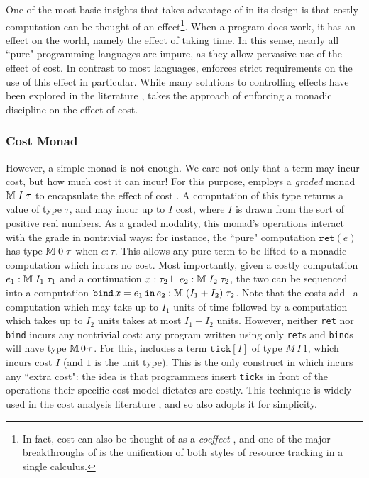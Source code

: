 One of the most basic insights that \lambdaamor takes advantage of in its design is that costly computation can be thought of an effect\footnote{
In fact, cost can also be thought of as a \textit{coeffect} \cite{girard-et-al:tcs92:bll}, and one of the major breakthroughs of \lambdaamor is the unification
of both styles of resource tracking in a single calculus.
}. When a program does work, it has an effect on the world, namely the effect of taking time. In this sense, nearly all ``pure" programming languages are impure, as they allow pervasive use of the effect of cost. In contrast to most languages, \lambdaamor enforces strict requirements on the use of this effect in particular. While many solutions to controlling effects have been explored in the literature \citehere, \lambdaamor takes the approach of enforcing a monadic \cite{moggi91} discipline on the effect of cost.

\subsubsection{Cost Monad}
However, a simple monad is not enough. We care not only that a term may incur cost, but how much cost it can incur! For this purpose, \lambdaamor employs a \textit{graded} monad $\mathbb{M} \; I \; \tau$ to encapsulate the effect of cost \cite{gaboardi-et-al:icfp16}. A computation of this type returns a value of type $\tau$, and may incur up to $I$ cost, where $I$ is drawn from the sort of positive real numbers. As a graded modality, this monad's operations interact with the grade in nontrivial ways: for instance, the ``pure" computation $\texttt{ret}(e)$ has type $\mathbb{M} \; 0 \; \tau$ when $e : \tau$. This allows any pure term to be lifted to a monadic computation which incurs no cost. Most importantly, given a costly computation $e_1 : \mathbb{M} \; I_1 \; \tau_1$ and a continuation $x : \tau_2 \vdash e_2 : \mathbb{M} \; I_2 \; \tau_2$, the two can be sequenced into a computation $\texttt{bind}\, x = e_1\, \texttt{in}\, e_2 : \mathbb{M} \; (I_1 + I_2) \; \tau_2$. Note that the costs add-- a computation which may take up to $I_1$ units of time followed by a computation which takes up to $I_2$ units takes at most $I_1 + I_2$ units. However, neither \texttt{ret} nor \texttt{bind} incurs any nontrivial cost: any program written using only \texttt{ret}s and \texttt{bind}s will have type $\mathbb{M} \, 0 \, \tau$. For this, \lambdaamor includes a term $\texttt{tick}[I]$ of type $M \, I \, 1$, which incurs cost $I$ (and $1$ is the unit type). This is the only construct in \lambdaamor which incurs any ``extra cost": the idea is that programmers insert \texttt{tick}s in front of the operations their specific cost model dictates are costly. This technique is widely used in the cost analysis literature \cite{danielsson:popl08}, and so \lambdaamor also adopts it for simplicity.
 
